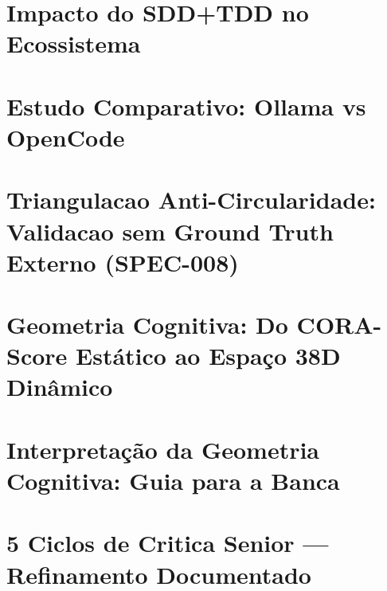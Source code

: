 \documentclass[12pt,a4paper,oneside]{article}
\begin{document}

\section{Impacto do SDD+TDD no Ecossistema}



\section{Estudo Comparativo: Ollama vs OpenCode}



\section{Triangulacao Anti-Circularidade: Validacao sem Ground Truth Externo (SPEC-008)}




\section{Geometria Cognitiva: Do CORA-Score Estático ao Espaço 38D Dinâmico}



\section{Interpretação da Geometria Cognitiva: Guia para a Banca}




\section{5 Ciclos de Critica Senior — Refinamento Documentado}
\end{document}
